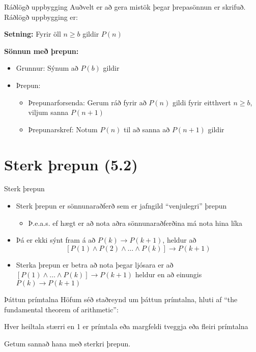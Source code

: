 \documentclass[handout]{beamer}
\begin{document}
\begin{frame}{Ráðlögð uppbygging}
Auðvelt er að gera mistök þegar þrepasönnun er skrifuð. Ráðlögð uppbygging er:

\vspace{0.5cm}

\textbf{Setning:} Fyrir öll $n \geq b$ gildir $P(n)$

\textbf{Sönnun með þrepun:}
\begin{itemize}
    \item Grunnur: Sýnum að $P(b)$ gildir
    \item Þrepun: 
    \begin{itemize}
        \item Þrepunarforsenda: Gerum ráð fyrir að $P(n)$ gildi fyrir eitthvert $n \geq b$, viljum sanna $P(n+1)$
        \item Þrepunarskref: Notum $P(n)$ til að sanna að $P(n+1)$ gildir
    \end{itemize}
\end{itemize}
\end{frame}

\section{Sterk þrepun (5.2)}

\begin{frame}{Sterk þrepun}
\begin{itemize}
    \item Sterk þrepun er sönnunaraðferð sem er jafngild ``venjulegri'' þrepun
    \begin{itemize}
        \item Þ.e.a.s. ef hægt er að nota aðra sönnunaraðferðina má nota hina líka
    \end{itemize}
    \item Þá er ekki sýnt fram á að $P(k) \to P(k+1)$, heldur að \[[P(1) \land P(2) \land \ldots \land P(k)] \to P(k+1)\]
    \item Sterka þrepun er betra að nota þegar ljósara er að $[P(1) \land \ldots \land P(k)] \to P(k+1)$ heldur en að einungis $P(k) \to P(k+1)$
\end{itemize}
\end{frame}

\begin{frame}{Þáttun prímtalna}
    Höfum séð staðreynd um þáttun prímtalna, hluti af ``the fundamental theorem of arithmetic'':

    \begin{tcolorbox}
        Hver heiltala stærri en 1 er prímtala eða margfeldi tveggja eða fleiri prímtalna
    \end{tcolorbox}

    Getum sannað hana með sterkri þrepun.
\end{frame}
\end{document}
